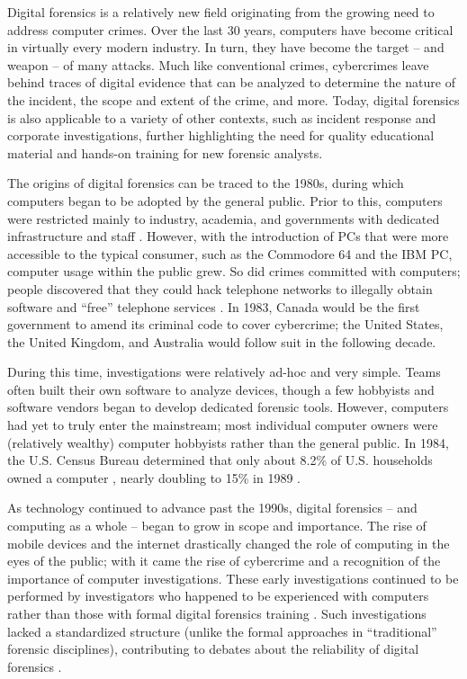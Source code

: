 \documentclass[letterpaper,12pt]{report}
\begin{document}
Digital forensics is a relatively new field originating from the growing
need to address computer crimes. Over the last 30 years, computers have
become critical in virtually every modern industry. In turn, they have
become the target -- and weapon -- of many attacks. Much like
conventional crimes, cybercrimes leave behind traces of digital evidence
that can be analyzed to determine the nature of the incident, the scope
and extent of the crime, and more. Today, digital forensics is also
applicable to a variety of other contexts, such as incident response and
corporate investigations, further highlighting the need for quality
educational material and hands-on training for new forensic analysts.

The origins of digital forensics can be traced to the 1980s, during
which computers began to be adopted by the general public. Prior to
this, computers were restricted mainly to industry, academia, and
governments with dedicated infrastructure and staff
\cite{pollittHistoryDigitalForensics2010}. However, with the
introduction of PCs that were more accessible to the typical consumer,
such as the Commodore 64 and the IBM PC, computer usage within the
public grew. So did crimes committed with computers; people discovered
that they could hack telephone networks to illegally obtain software and
``free'' telephone services \cite{jonesInsightDigitalForensics2022}.
In 1983, Canada would be the first government to amend its criminal code
to cover cybercrime; the United States, the United Kingdom, and
Australia would follow suit in the following decade.

During this time, investigations were relatively ad-hoc and very simple.
Teams often built their own software to analyze devices, though a few
hobbyists and software vendors began to develop dedicated forensic
tools. However, computers had yet to truly enter the mainstream; most
individual computer owners were (relatively wealthy) computer hobbyists
rather than the general public. In 1984, the U.S. Census Bureau
determined that only about 8.2\% of U.S. households owned a computer
\cite{robertkominskiComputerUseUnited1988}, nearly doubling to 15\%
in 1989 \cite{robertkominskiComputerUseUnited1991}.

As technology continued to advance past the 1990s, digital forensics --
and computing as a whole -- began to grow in scope and importance. The
rise of mobile devices and the internet drastically changed the role of
computing in the eyes of the public; with it came the rise of cybercrime
and a recognition of the importance of computer investigations. These
early investigations continued to be performed by investigators who
happened to be experienced with computers rather than those with formal
digital forensics training
\cite{hargreavesDigitalForensicsEducation2017}. Such investigations
lacked a standardized structure (unlike the formal approaches in
``traditional'' forensic disciplines), contributing to debates about the
reliability of digital forensics \cite{montasariRoadMapDigital2019}.
\end{document}
